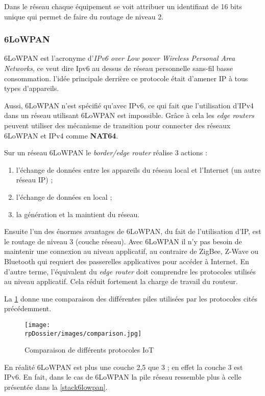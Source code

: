 Dans le réseau chaque équipement se voit attribuer un identifiant de 16 bits unique qui permet de faire du routage de niveau 2.

\subsubsection{6LoWPAN}

6LoWPAN est l'acronyme d'\textit{IPv6 over Low power Wireless Personal Area Networks}, ce veut dire Ipv6 au dessus de réseau personnelle sans-fil basse consommation. l'idée principale derrière ce protocole était d'amener IP à tous types d'appareils. 

Aussi, 6LoWPAN n'est spécifié qu'avec IPv6, ce qui fait que l'utilisation d'IPv4 dans un réseau utilisant 6LoWPAN est impossible. Grâce à cela les \textit{edge routers} peuvent utiliser des mécanisme de transition pour connecter des réseaux 6LoWPAN et IPv4 comme \textbf{NAT64}.

Sur un réseau 6LoWPAN le \textit{border/edge router} réalise 3 actions :
\begin{enumerate}
	\item l'échange de données entre les appareils du réseau local et l'Internet (un autre réseau IP) ;
	\item l'échange de données en local ;
	\item la génération et la maintient du réseau.
\end{enumerate}

Ensuite l'un des énormes avantages de 6LoWPAN, du fait de l'utilisation d'IP, est le routage de niveau 3 (couche réseau). Avec 6LoWPAN il n'y pas besoin de maintenir une connexion au niveau applicatif, au contraire de ZigBee, Z-Wave ou Bluetooth qui requiert des passerelles applicatives pour accéder à Internet. En d'autre terme, l'équivalent du \textit{edge router} doit comprendre les protocoles utilisés au niveau applicatif. Cela réduit fortement la charge de travail du routeur.

La \cref{comparison} donne une comparaison des différentes piles utilisées par les protocoles cités précédemment.

\begin{figure}[H]
\centering
\texttt{[image: \\rpDossier/images/comparison.jpg]}
\caption{Comparaison de différents protocoles IoT}
\label{comparison}
\end{figure}

En réalité 6LoWPAN est plus une couche 2,5 que 3 ; en effet la couche 3 est IPv6. En fait, dans le cas de 6LoWPAN la pile réseau ressemble plus à celle présentée dans la \cref{stack6lowpan}.

